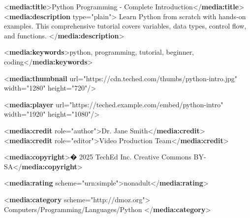 \documentclass[
  letterpaper,
  DIV=11,
  numbers=noendperiod]{scrartcl}
\newenvironment{Shaded}{\begin{snugshade}}{\end{snugshade}}
\newcommand{\KeywordTok}[1]{\textcolor[rgb]{0.00,0.23,0.31}{\textbf{#1}}}
\newcommand{\NormalTok}[1]{\textcolor[rgb]{0.00,0.23,0.31}{#1}}
\newcommand{\OtherTok}[1]{\textcolor[rgb]{0.00,0.23,0.31}{#1}}
\newcommand{\StringTok}[1]{\textcolor[rgb]{0.13,0.47,0.30}{#1}}
\begin{document}
\begin{Shaded}
\begin{Highlighting}[]
\NormalTok{          \textless{}}\KeywordTok{media:title}\NormalTok{\textgreater{}Python Programming {-} Complete Introduction\textless{}/}\KeywordTok{media:title}\NormalTok{\textgreater{}}
\NormalTok{          \textless{}}\KeywordTok{media:description}\OtherTok{ type=}\StringTok{"plain"}\NormalTok{\textgreater{}}
\NormalTok{Learn Python from scratch with hands{-}on examples. }
\NormalTok{            This comprehensive tutorial covers variables, data types, }
\NormalTok{          control flow, and functions.}
\NormalTok{          \textless{}/}\KeywordTok{media:description}\NormalTok{\textgreater{}}
      
\NormalTok{          \textless{}}\KeywordTok{media:keywords}\NormalTok{\textgreater{}python, programming, tutorial, beginner, coding\textless{}/}\KeywordTok{media:keywords}\NormalTok{\textgreater{}}
          
\NormalTok{          \textless{}}\KeywordTok{media:thumbnail} 
\OtherTok{        url=}\StringTok{"https://cdn.teched.com/thumbs/python{-}intro.jpg"}
\OtherTok{     width=}\StringTok{"1280"}
\OtherTok{              height=}\StringTok{"720"}\NormalTok{/\textgreater{}}
 
\NormalTok{    \textless{}}\KeywordTok{media:player} 
\OtherTok{           url=}\StringTok{"https://teched.example.com/embed/python{-}intro"}
\OtherTok{    width=}\StringTok{"1920"}
\OtherTok{  height=}\StringTok{"1080"}\NormalTok{/\textgreater{}}
   
\NormalTok{          \textless{}}\KeywordTok{media:credit}\OtherTok{ role=}\StringTok{"author"}\NormalTok{\textgreater{}Dr. Jane Smith\textless{}/}\KeywordTok{media:credit}\NormalTok{\textgreater{}}
\NormalTok{          \textless{}}\KeywordTok{media:credit}\OtherTok{ role=}\StringTok{"editor"}\NormalTok{\textgreater{}Video Production Team\textless{}/}\KeywordTok{media:credit}\NormalTok{\textgreater{}}
          
\NormalTok{          \textless{}}\KeywordTok{media:copyright}\NormalTok{\textgreater{}� 2025 TechEd Inc. Creative Commons BY{-}SA\textless{}/}\KeywordTok{media:copyright}\NormalTok{\textgreater{}}
          
\NormalTok{     \textless{}}\KeywordTok{media:rating}\OtherTok{ scheme=}\StringTok{"urn:simple"}\NormalTok{\textgreater{}nonadult\textless{}/}\KeywordTok{media:rating}\NormalTok{\textgreater{}}
      
\NormalTok{     \textless{}}\KeywordTok{media:category}\OtherTok{ scheme=}\StringTok{"http://dmoz.org"}\NormalTok{\textgreater{}}
\NormalTok{         Computers/Programming/Languages/Python}
\NormalTok{ \textless{}/}\KeywordTok{media:category}\NormalTok{\textgreater{}}
          

\end{Highlighting}
\end{Shaded}
\end{document}
